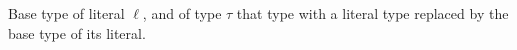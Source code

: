 Base type of literal $\ell$, and of type $\tau$ that type with a literal type replaced by the base type of
its literal.
